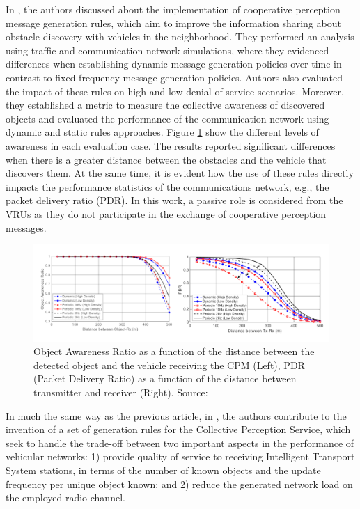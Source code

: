 In \cite{Thandavarayan2019}, the authors discussed about the implementation of cooperative perception message generation rules, which aim to improve the information sharing about obstacle discovery with vehicles in the neighborhood. They performed an analysis using traffic and communication network simulations, where they evidenced differences when establishing dynamic message generation policies over time in contrast to fixed frequency message generation policies. Authors also evaluated the impact of these rules on high and low denial of service scenarios. Moreover, they established a metric to measure the collective awareness of discovered objects and evaluated the performance of the communication network using dynamic and static rules approaches. Figure \ref{fig:Than} show the different levels of awareness in each evaluation case. The results reported significant differences when there is a greater distance between the obstacles and the vehicle that discovers them. At the same time, it is evident how the use of these rules directly impacts the performance statistics of the communications network, e.g., the packet delivery ratio (PDR). In this work, a passive role is considered from the VRUs as they do not participate in the exchange of cooperative perception messages. 
\begin{figure}[ht!]
    \centering
    \includegraphics[width=15cm]{FIGURES/Fig4.png}
    \caption{Object Awareness Ratio as a function of the distance between the detected object and the vehicle receiving the CPM (Left), PDR (Packet Delivery Ratio) as a function of the distance between transmitter and receiver (Right). Source: \cite{Thandavarayan2019}}
    \label{fig:Than}
\end{figure}

In much the same way as the previous article, in \cite{Garlichs2019}, the authors contribute to the invention of a set of generation rules for the Collective Perception Service, which seek to handle the trade-off between two important aspects in the performance of vehicular networks: 1) provide quality of service to receiving Intelligent Transport System stations, in terms of the number of known objects and the update frequency per unique object known; and 2) reduce the generated network load on the employed radio channel.

